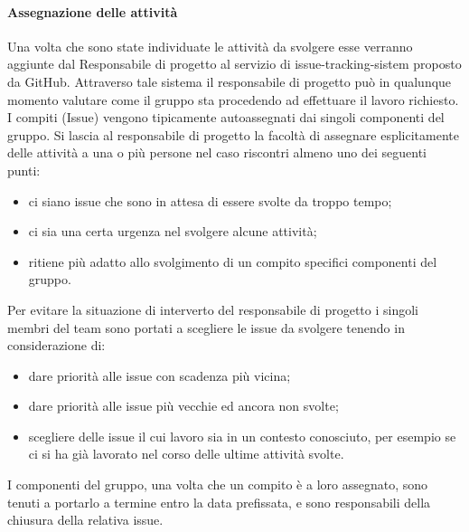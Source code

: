 \paragraph{Assegnazione delle attività}
Una volta che sono state individuate le attività da svolgere esse verranno aggiunte dal Responsabile di progetto al servizio di issue-tracking-sistem proposto da GitHub.
Attraverso tale sistema il responsabile di progetto può in qualunque momento valutare come il gruppo sta procedendo ad effettuare il lavoro richiesto.\\
I compiti (Issue) vengono tipicamente autoassegnati dai singoli componenti del gruppo. Si lascia al responsabile di progetto la facoltà di assegnare esplicitamente delle attività a una o più persone nel caso riscontri almeno uno dei seguenti punti:
\begin{itemize}
    \item ci siano issue che sono in attesa di essere svolte da troppo tempo;
    \item ci sia una certa urgenza nel svolgere alcune attività;
    \item ritiene più adatto allo svolgimento di un compito specifici componenti del gruppo.
\end{itemize}
Per evitare la situazione di interverto del responsabile di progetto i singoli membri del team sono portati a scegliere le issue da svolgere tenendo in considerazione di:
\begin{itemize}
    \item dare priorità alle issue con scadenza più vicina;
    \item dare priorità alle issue più vecchie ed ancora non svolte;
    \item scegliere delle issue il cui lavoro sia in un contesto conosciuto, per esempio se ci si ha già lavorato nel corso delle ultime attività svolte.
\end{itemize}
I componenti del gruppo, una volta che un compito è a loro assegnato, sono tenuti a portarlo a termine entro la data prefissata, e sono responsabili della chiusura della relativa issue.

